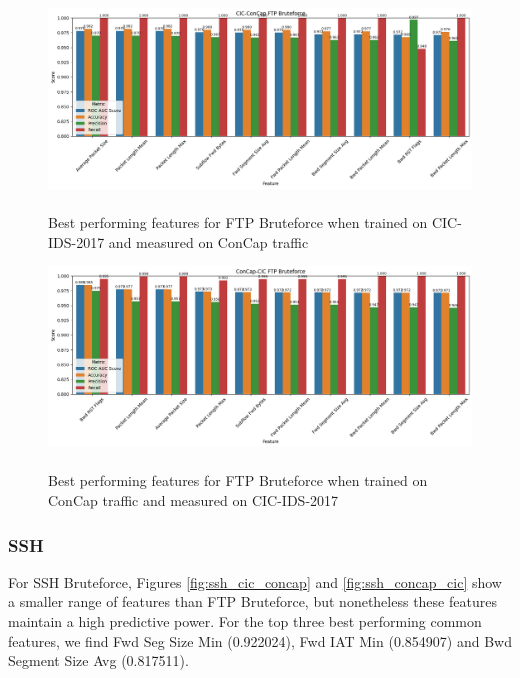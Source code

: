 \begin{figure}[!htbp]
	\centering
	\includegraphics[width=1.2\linewidth]{images/ftp_cic_concap}
	\caption{\\Best performing features for FTP Bruteforce when trained on CIC-IDS-2017 and measured on ConCap traffic}
	\label{fig:ftp_cic_concap}
\end{figure}

\begin{figure}
	\centering
	\includegraphics[width=1.2\linewidth]{images/ftp_concap_cic}
	\caption{\\Best performing features for FTP Bruteforce when trained on ConCap traffic and measured on CIC-IDS-2017}
	\label{fig:ftp_concap_cic}
\end{figure}


\subsubsection{SSH}
For SSH Bruteforce, Figures \ref{fig:ssh_cic_concap} and \ref{fig:ssh_concap_cic} show a smaller range of features than FTP Bruteforce, but nonetheless these features maintain a high predictive power. For the top three best performing common features, we find Fwd Seg Size Min (0.922024), Fwd IAT Min (0.854907) and Bwd Segment Size Avg (0.817511). 


